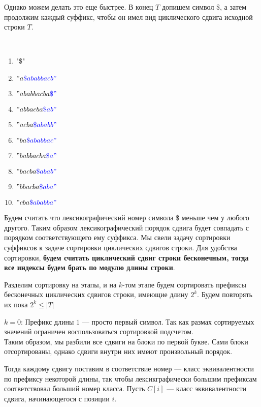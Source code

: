 Однако можем делать это еще быстрее.
В конец $T$ допишем символ \$, а затем продолжим каждый суффикс, чтобы он имел вид циклического сдвига исходной строки $T$.

\begin{example}   \
\begin{enumerate}
    \item "\$"
    \item $"a\color{blue}\$ababbacb"$
    \item $"ababbacba\color{blue}\$"$
    \item $"abbacba\color{blue}\$ab"$
    \item $"acba\color{blue}\$ababb"$
    \item $"ba\color{blue}\$ababbac"$
    \item $"babbacba\color{blue}\$a"$
    \item $"bacba\color{blue}\$abab"$
    \item $"bbacba\color{blue}\$aba"$
    \item $"cba\color{blue}\$ababba"$
\end{enumerate}
\end{example}

Будем считать что лексикографический номер символа \$ меньше чем у любого другого. Таким образом лексикографический порядок сдвига будет совпадать с порядком соответствующего ему суффикса.
Мы свели задачу сортировки суффиксов к задаче сортировки циклических сдвигов строки.
Для удобства сортировки, \textbf{будем считать циклический сдвиг строки бесконечным, тогда все индексы будем брать по модулю длины строки}.

Разделим сортировку на этапы, и на $k$-том этапе будем сортировать префиксы бесконечных циклических сдвигов строки, имеющие длину $2 ^ k$.
Будем повторять их пока $2 ^ k \leq \lvert T \rvert$

\begin{example}
\underline{$k = 0$}:
        Префикс длины $1$ --- просто первый символ. Так как размах сортируемых значений ограничен воспользоваться сортировкой подсчетом. \\
        Таким образом, мы разбили все сдвиги на блоки по первой букве. Сами блоки отсортированы, однако сдвиги внутри них имеют произвольный порядок.
\end{example}
Тогда каждому сдвигу поставим в соответствие номер --- класс эквивалентности по префиксу некоторой длины, так чтобы лексикграфически большим префиксам соответствовал больший номер класса.
Пусть $C[i]$ --- класс эквивалентности сдвига, начинающегося с позиции  $i$.

